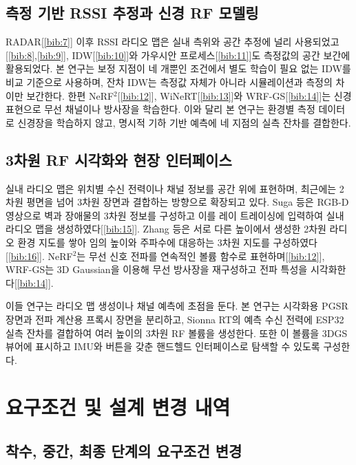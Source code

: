 \documentclass[11pt,a4paper]{article}
\begin{document}
\subsection{측정 기반 RSSI 추정과 신경 RF 모델링}
\label{sec:2.3}

RADAR[\ref{bib:7}] 이후 RSSI 라디오 맵은 실내 측위와 공간 추정에 널리 사용되었고[\ref{bib:8},\ref{bib:9}],
IDW[\ref{bib:10}]와 가우시안 프로세스[\ref{bib:11}]도 측정값의 공간 보간에 활용되었다. 본 연구는 보정 지점이 네 개뿐인 조건에서 별도 학습이 필요 없는
IDW를 비교 기준으로 사용하며, 잔차 IDW는 측정값 자체가 아니라 시뮬레이션과 측정의 차이만 보간한다. 한편 NeRF$^2$[\ref{bib:12}],
WiNeRT[\ref{bib:13}]와 WRF-GS[\ref{bib:14}]는 신경 표현으로 무선 채널이나 방사장을 학습한다. 이와 달리 본 연구는 환경별 측정 데이터로 신경장을
학습하지 않고, 명시적 기하 기반 예측에 네 지점의 실측 잔차를 결합한다.

\subsection{3차원 RF 시각화와 현장 인터페이스}
\label{sec:2.4}

실내 라디오 맵은 위치별 수신 전력이나 채널 정보를 공간 위에 표현하며, 최근에는 2차원 평면을 넘어 3차원 장면과 결합하는 방향으로 확장되고 있다. Suga 등은 RGB-D
영상으로 벽과 장애물의 3차원 정보를 구성하고 이를 레이 트레이싱에 입력하여 실내 라디오 맵을 생성하였다[\ref{bib:15}]. Zhang 등은 서로 다른 높이에서 생성한
2차원 라디오 환경 지도를 쌓아 임의 높이와 주파수에 대응하는 3차원 지도를 구성하였다[\ref{bib:16}]. NeRF$^2$는 무선 신호 전파를 연속적인 볼륨 함수로
표현하며[\ref{bib:12}], WRF-GS는 3D Gaussian을 이용해 무선 방사장을 재구성하고 전파 특성을 시각화한다[\ref{bib:14}].

이들 연구는 라디오 맵 생성이나 채널 예측에 초점을 둔다. 본 연구는 시각화용 PGSR 장면과 전파 계산용 프록시 장면을 분리하고, Sionna RT의 예측 수신 전력에 ESP32
실측 잔차를 결합하여 여러 높이의 3차원 RF 볼륨을 생성한다. 또한 이 볼륨을 3DGS 뷰어에 표시하고 IMU와 버튼을 갖춘 핸드헬드 인터페이스로 탐색할 수 있도록 구성한다.

\section{요구조건 및 설계 변경 내역}
\label{sec:changes}

\subsection{착수, 중간, 최종 단계의 요구조건 변경}
\label{sec:changes-req}
\end{document}
